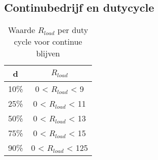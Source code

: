 \subsection{Continubedrijf en dutycycle}
\begin{table}[h!]
\centering
\begin{tabular}{|c|c|}
\hline
\textbf{d} & \textbf{\(R_{load}\)} \\ \hline
10\% & 0 < \(R_{load}\) < 9\\ \hline
25\% & 0 < \(R_{load}\) < 11\\ \hline
50\% & 0 < \(R_{load}\) < 13\\ \hline
75\% & 0 < \(R_{load}\) < 15\\ \hline
90\% & 0 < \(R_{load}\) < 125\\ \hline
\end{tabular}
\caption{Waarde \(R_{load}\) per duty cycle voor continue blijven}
\label{tab:dutycycle_rload}
\end{table}